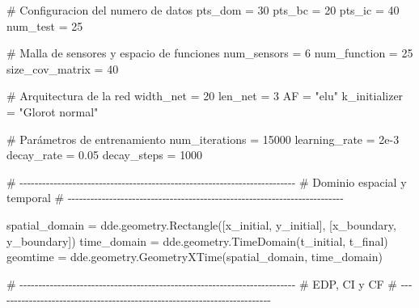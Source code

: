 \documentclass[
  spanish,
  us-letterpaper,
]{scrreprt}
\newenvironment{Shaded}{\begin{snugshade}}{\end{snugshade}}
\newcommand{\CommentTok}[1]{\textcolor[rgb]{0.37,0.37,0.37}{#1}}
\newcommand{\DecValTok}[1]{\textcolor[rgb]{0.68,0.00,0.00}{#1}}
\newcommand{\FloatTok}[1]{\textcolor[rgb]{0.68,0.00,0.00}{#1}}
\newcommand{\NormalTok}[1]{\textcolor[rgb]{0.00,0.23,0.31}{#1}}
\newcommand{\OperatorTok}[1]{\textcolor[rgb]{0.37,0.37,0.37}{#1}}
\newcommand{\StringTok}[1]{\textcolor[rgb]{0.13,0.47,0.30}{#1}}
\theoremstyle{plain}
\theoremstyle{definition}
\theoremstyle{remark}
\begin{document}
\begin{Shaded}
\begin{Highlighting}[]
\CommentTok{\# Configuracion del numero de datos}
\NormalTok{pts\_dom }\OperatorTok{=} \DecValTok{30}
\NormalTok{pts\_bc }\OperatorTok{=} \DecValTok{20}
\NormalTok{pts\_ic }\OperatorTok{=} \DecValTok{40}
\NormalTok{num\_test }\OperatorTok{=} \DecValTok{25}

\CommentTok{\# Malla de sensores y espacio de funciones}
\NormalTok{num\_sensors }\OperatorTok{=} \DecValTok{6}
\NormalTok{num\_function }\OperatorTok{=} \DecValTok{25}
\NormalTok{size\_cov\_matrix }\OperatorTok{=} \DecValTok{40}

\CommentTok{\# Arquitectura de la red}
\NormalTok{width\_net }\OperatorTok{=} \DecValTok{20}
\NormalTok{len\_net }\OperatorTok{=} \DecValTok{3}
\NormalTok{AF }\OperatorTok{=} \StringTok{"elu"}
\NormalTok{k\_initializer }\OperatorTok{=} \StringTok{"Glorot normal"}


\CommentTok{\# Parámetros de entrenamiento}
\NormalTok{num\_iterations }\OperatorTok{=} \DecValTok{15000}
\NormalTok{learning\_rate }\OperatorTok{=} \FloatTok{2e{-}3}
\NormalTok{decay\_rate }\OperatorTok{=} \FloatTok{0.05}
\NormalTok{decay\_steps }\OperatorTok{=} \DecValTok{1000}

\CommentTok{\# {-}{-}{-}{-}{-}{-}{-}{-}{-}{-}{-}{-}{-}{-}{-}{-}{-}{-}{-}{-}{-}{-}{-}{-}{-}{-}{-}{-}{-}{-}{-}{-}{-}{-}{-}{-}{-}{-}{-}{-}{-}{-}{-}{-}{-}{-}{-}{-}{-}{-}{-}{-}{-}{-}{-}{-}{-}{-}{-}{-}{-}{-}{-}{-}{-}{-}{-}{-}{-}{-}{-}{-}{-}}
\CommentTok{\# Dominio espacial y temporal}
\CommentTok{\# {-}{-}{-}{-}{-}{-}{-}{-}{-}{-}{-}{-}{-}{-}{-}{-}{-}{-}{-}{-}{-}{-}{-}{-}{-}{-}{-}{-}{-}{-}{-}{-}{-}{-}{-}{-}{-}{-}{-}{-}{-}{-}{-}{-}{-}{-}{-}{-}{-}{-}{-}{-}{-}{-}{-}{-}{-}{-}{-}{-}{-}{-}{-}{-}{-}{-}{-}{-}{-}{-}{-}{-}{-}}

\NormalTok{spatial\_domain }\OperatorTok{=}\NormalTok{ dde.geometry.Rectangle([x\_initial, y\_initial],}
\NormalTok{                                        [x\_boundary, y\_boundary])}
\NormalTok{time\_domain }\OperatorTok{=}\NormalTok{ dde.geometry.TimeDomain(t\_initial, t\_final)}
\NormalTok{geomtime }\OperatorTok{=}\NormalTok{ dde.geometry.GeometryXTime(spatial\_domain, time\_domain)}

\CommentTok{\# {-}{-}{-}{-}{-}{-}{-}{-}{-}{-}{-}{-}{-}{-}{-}{-}{-}{-}{-}{-}{-}{-}{-}{-}{-}{-}{-}{-}{-}{-}{-}{-}{-}{-}{-}{-}{-}{-}{-}{-}{-}{-}{-}{-}{-}{-}{-}{-}{-}{-}{-}{-}{-}{-}{-}{-}{-}{-}{-}{-}{-}{-}{-}{-}{-}{-}{-}{-}{-}{-}{-}{-}{-}}
\CommentTok{\# EDP, CI y CF }
\CommentTok{\# {-}{-}{-}{-}{-}{-}{-}{-}{-}{-}{-}{-}{-}{-}{-}{-}{-}{-}{-}{-}{-}{-}{-}{-}{-}{-}{-}{-}{-}{-}{-}{-}{-}{-}{-}{-}{-}{-}{-}{-}{-}{-}{-}{-}{-}{-}{-}{-}{-}{-}{-}{-}{-}{-}{-}{-}{-}{-}{-}{-}{-}{-}{-}{-}{-}{-}{-}{-}{-}{-}{-}{-}{-}}


\end{Highlighting}
\end{Shaded}
\end{document}

